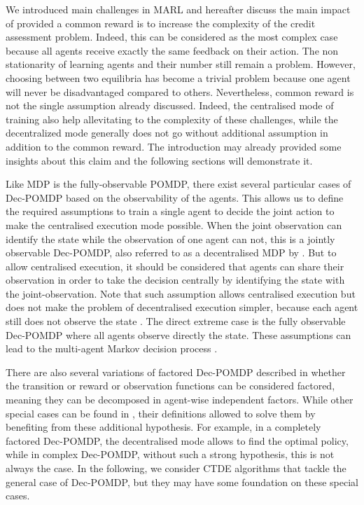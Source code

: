 We introduced main challenges in MARL and hereafter discuss the main impact of provided a common reward is to increase the complexity of the credit assessment problem.
Indeed, this can be considered as the most complex case because all agents receive exactly the same feedback on their action.
The non stationarity of learning agents and their number still remain a problem.
However, choosing between two equilibria has become a trivial problem because one agent will never be disadvantaged compared to others.
Nevertheless, common reward is not the single assumption already discussed.
Indeed, the centralised mode of training also help allevitating to the complexity of these challenges, while the decentralized mode generally does not go without additional assumption in addition to the common reward.
The introduction may already provided some insights about this claim and the following sections will demonstrate it.

Like MDP is the fully-observable POMDP, there exist several particular cases of Dec-POMDP based on the observability of the agents.
This allows us to define the required assumptions to train a single agent to decide the joint action to make the centralised execution mode possible.
When the joint observation can identify the state while the observation of one agent can not, this is a jointly observable Dec-POMDP, also referred to as a decentralised MDP by \cite{DecPomdp}.
But to allow centralised execution, it should be considered that agents can share their observation in order to take the decision centrally by identifying the state with the joint-observation.
Note that such assumption allows centralised execution but does not make the problem of decentralised execution simpler, because each agent still does not observe the state \citep{bernstein2002complexity}.
The direct extreme case is the fully observable Dec-POMDP where all agents observe directly the state.
These assumptions can lead to the multi-agent Markov decision process \citep{boutilier1996planning}.

There are also several variations of factored Dec-POMDP described in \citep{DecPomdp} whether the transition or reward or observation functions can be considered factored, meaning they can be decomposed in agent-wise independent factors.
While other special cases can be found in \citep{DecPomdp}, their definitions allowed to solve them by benefiting from these additional hypothesis.
For example, in a completely factored Dec-POMDP, the decentralised mode allows to find the optimal policy, while in complex Dec-POMDP, without such a strong hypothesis, this is not always the case.
In the following, we consider CTDE algorithms that tackle the general case of Dec-POMDP, but they may have some foundation on these special cases.

